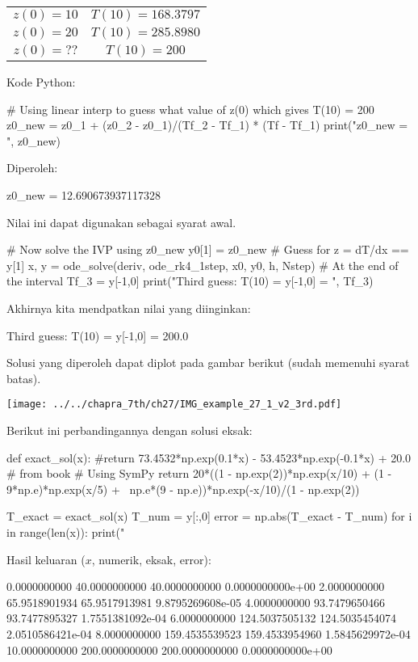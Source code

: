 {\centering
\begin{tabular}{|c|c|}
\hline
$z(0) = 10$ & $T(10) = 168.3797$ \\
$z(0) = 20$ & $T(10) = 285.8980$ \\
$z(0) = ??$ & $T(10) = 200$ \\
\hline
\end{tabular}
\par}

Kode Python:
\begin{pythoncode}
# Using linear interp to guess what value of z(0) which gives T(10) = 200
z0_new = z0_1 + (z0_2 - z0_1)/(Tf_2 - Tf_1) * (Tf - Tf_1)
print("z0_new = ", z0_new)
\end{pythoncode}
Diperoleh:
\begin{textcode}
z0_new =  12.690673937117328
\end{textcode}

Nilai ini dapat digunakan sebagai syarat awal.
\begin{pythoncode}
# Now solve the IVP using z0_new
y0[1] = z0_new # Guess for z = dT/dx == y[1]
x, y = ode_solve(deriv, ode_rk4_1step, x0, y0, h, Nstep)
# At the end of the interval
Tf_3 = y[-1,0]
print("Third guess: T(10) = y[-1,0] = ", Tf_3)
\end{pythoncode}
Akhirnya kita mendpatkan nilai yang diinginkan:
\begin{textcode}
Third guess: T(10) = y[-1,0] =  200.0
\end{textcode}

Solusi yang diperoleh dapat diplot pada gambar berikut (sudah memenuhi syarat batas).

{\centering
\texttt{[image: ../../chapra\_7th/ch27/IMG\_example\_27\_1\_v2\_3rd.pdf]}
\par}


Berikut ini perbandingannya dengan solusi eksak:
\begin{pythoncode}
def exact_sol(x):
    #return 73.4532*np.exp(0.1*x) - 53.4523*np.exp(-0.1*x) + 20.0 # from book
    # Using SymPy
    return 20*((1 - np.exp(2))*np.exp(x/10) + (1 - 9*np.e)*np.exp(x/5) + \
            np.e*(9 - np.e))*np.exp(-x/10)/(1 - np.exp(2))

T_exact = exact_sol(x)
T_num = y[:,0]
error = np.abs(T_exact - T_num)
for i in range(len(x)):
    print("%
\end{pythoncode}

Hasil keluaran ($x$, numerik, eksak, error):
\begin{textcode}
    0.0000000000      40.0000000000      40.0000000000 0.0000000000e+00
    2.0000000000      65.9518901934      65.9517913981 9.8795269608e-05
    4.0000000000      93.7479650466      93.7477895327 1.7551381092e-04
    6.0000000000     124.5037505132     124.5035454074 2.0510586421e-04
    8.0000000000     159.4535539523     159.4533954960 1.5845629972e-04
   10.0000000000     200.0000000000     200.0000000000 0.0000000000e+00
\end{textcode}


